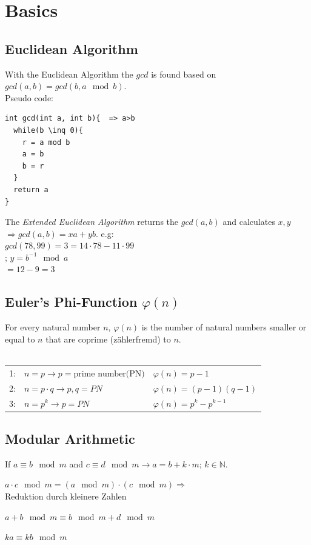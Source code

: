 \section{Basics}
\begin{multicols}{2}
\subsection{Euclidean Algorithm}
With the Euclidean Algorithm the $gcd$ is found based on $gcd(a,b)=gcd(b,a \mod b)$.\\ 
Pseudo code:
\begin{verbatim}
int gcd(int a, int b){	=> a>b
  while(b \inq 0){
    r = a mod b
    a = b
    b = r
  }
  return a
}
\end{verbatim}
The \textit{Extended Euclidean Algorithm} returns the $gcd(a,b)$ and calculates $x,y$ $\Rightarrow gcd(a,b)=x a + y b$. 
e.g:\\ 
$gcd(78,99)=3=14 \cdot 78 - 11 \cdot 99$\\
\negmedspace; $y=b^{-1} \mod a$\\
$=12-9=3$\\

\subsection{Euler's Phi-Function $\varphi(n)$}
For every natural number $n$, $\varphi(n)$ is the number of natural numbers smaller or equal to $n$ that are coprime (zählerfremd) to $n$.\\
\\ 

\begin{tabular}{| l l l |}
	\hline
	1:		&	$n=p \to p=\text{prime number(PN)}$				&	$\varphi(n)=p-1$\\
	2:		&	$n=p \cdot q \to p,q=PN$	&	$\varphi(n)=(p-1)(q-1)$\\
	3:		&	$n=p^k \to p=PN$			&	$\varphi(n)=p^k-p^{k-1}$\\
	\hline
\end{tabular}

\subsection{Modular Arithmetic}
If $a \equiv b \mod m$ and $c \equiv d \mod m \to a=b+k \cdot m$; $k \in \mathbb{N}$.
\begin{liste}
\item $a \cdot c \mod m = (a \mod m) \cdot (c \mod m) \Rightarrow$ \\ Reduktion durch kleinere Zahlen
\item $a + b \mod m \equiv b \mod m + d \mod m$
\item $k a \equiv k b \mod m$
\end{liste}%
\end{multicols}

